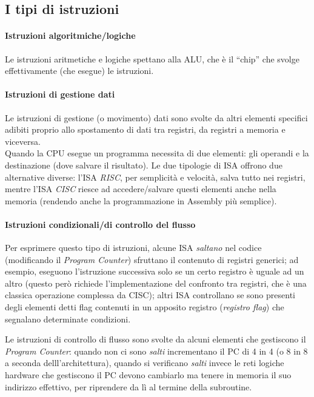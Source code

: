 \documentclass[class=book, crop=false, oneside]{standalone}
\begin{document}
\subsection{I tipi di istruzioni}

\paragraph*{Istruzioni algoritmiche/logiche}
Le istruzioni aritmetiche e logiche spettano alla ALU, che è il “chip” che svolge effettivamente (che esegue) le istruzioni.

\paragraph*{Istruzioni di gestione dati}
Le istruzioni di gestione (o movimento) dati sono svolte da altri elementi specifici adibiti proprio allo spostamento di dati tra registri, da registri a memoria  e viceversa.\\
Quando la CPU esegue un programma necessita di due elementi: gli operandi e la destinazione (dove salvare il risultato). Le due tipologie di ISA offrono due alternative diverse: l’ISA \emph{RISC}, per semplicità  e velocità, salva tutto nei registri, mentre l’ISA \emph{CISC} riesce ad accedere/salvare questi elementi anche nella memoria (rendendo anche la programmazione in Assembly più semplice).

\paragraph*{Istruzioni condizionali/di controllo del flusso}
Per esprimere questo tipo di istruzioni, alcune ISA \emph{saltano} nel codice (modificando il \emph{Program Counter}) sfruttano il contenuto di registri generici; ad esempio, eseguono l’istruzione successiva solo se un certo registro è uguale ad un altro (questo però richiede l’implementazione del confronto tra registri, che è una classica operazione complessa da CISC); altri ISA controllano se sono presenti  degli elementi detti flag contenuti in un apposito registro (\emph{registro flag}) che segnalano determinate condizioni.

Le istruzioni di controllo di flusso sono svolte da alcuni elementi che gestiscono il \emph{Program Counter}: quando non ci sono \emph{salti} incrementano il PC di 4 in 4 (o 8 in 8 a seconda delll’architettura), quando si verificano \emph{salti} invece le reti logiche hardware che gestiscono il PC devono cambiarlo ma tenere in memoria il suo indirizzo effettivo, per riprendere da lì al termine della subroutine.
\end{document}
